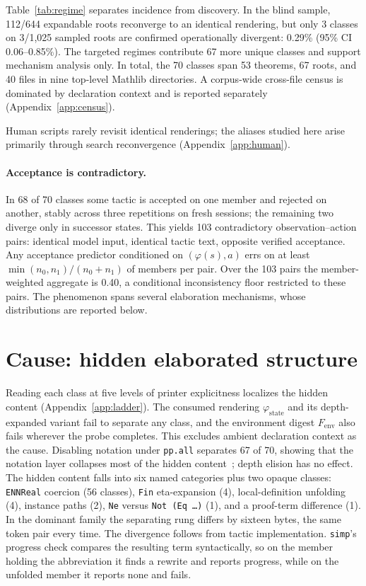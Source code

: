 \documentclass[11pt]{article}
\begin{document}
Table~\ref{tab:regime} separates incidence from discovery. In the blind sample,
112/644 expandable roots reconverge to an identical rendering, but only 3
classes on 3/1{,}025 sampled roots are confirmed operationally divergent:
0.29\% (95\% CI 0.06--0.85\%). The targeted regimes contribute 67 more unique
classes and support mechanism analysis only. In total, the
70 classes span 53 theorems, 67 roots, and 40 files in nine top-level Mathlib
directories. A corpus-wide cross-file census is dominated by declaration
context and is reported separately (Appendix~\ref{app:census}).

Human scripts rarely revisit identical renderings; the aliases studied here
arise primarily through search reconvergence (Appendix~\ref{app:human}).

\paragraph{Acceptance is contradictory.}
In 68 of 70 classes some tactic is accepted on one
member and rejected on another, stably across three repetitions on fresh
sessions; the remaining two diverge only in successor states. This yields
103 contradictory observation--action pairs: identical model input,
identical tactic text, opposite verified acceptance. Any acceptance predictor
conditioned on $(\varphi(s),a)$ errs on at least $\min(n_0,n_1)/(n_0+n_1)$ of
members per pair. Over the 103 pairs the member-weighted aggregate is 0.40, a
conditional inconsistency floor restricted to these pairs. The phenomenon
spans several elaboration mechanisms, whose distributions are reported below.

\section{Cause: hidden elaborated structure}
\label{sec:mechanism}
\FigIntervention

Reading each class at five levels of printer explicitness localizes the hidden
content (Appendix~\ref{app:ladder}). The consumed rendering
$\varphi_\mathrm{state}$ and its depth-expanded variant fail to separate any
class, and the environment digest $F_\mathrm{env}$ also fails wherever the
probe completes. This excludes ambient declaration context as the cause.
Disabling notation under \texttt{pp.all} separates 67 of 70, showing that the
notation layer collapses most of the hidden content~\cite{ullrich2020beyond};
depth elision has no effect. The hidden content falls into six named categories
plus two opaque classes: \texttt{ENNReal} coercion (56 classes), \texttt{Fin}
eta-expansion (4), local-definition unfolding (4), instance paths (2),
\texttt{Ne} versus \texttt{Not (Eq \ldots)} (1), and a proof-term difference
(1). In the dominant family the separating rung differs by sixteen bytes, the
same token pair every time. The divergence follows from tactic implementation.
\texttt{simp}'s progress check
compares the resulting term syntactically, so on the member holding the
abbreviation it finds a rewrite and reports progress, while on the unfolded
member it reports none and fails.
\end{document}
